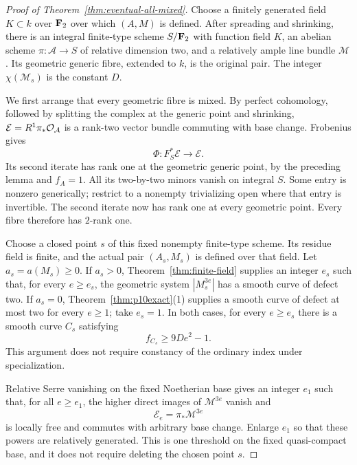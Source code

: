 \begin{proof}[Proof of Theorem~\ref{thm:eventual-all-mixed}]
Choose a finitely generated field $K\subset k$ over $\mathbf F_2$ over which $(A,M)$ is defined. After spreading and shrinking, there is an integral finite-type scheme $S/\mathbf F_2$ with function field $K$, an abelian scheme $\pi:\mathcal A\to S$ of relative dimension two, and a relatively ample line bundle $\mathcal M$. Its geometric generic fibre, extended to $k$, is the original pair. The integer $\chi(\mathcal M_s)$ is the constant $D$.

We first arrange that every geometric fibre is mixed. By perfect cohomology, followed by splitting the complex at the generic point and shrinking, $\mathcal E=R^1\pi_*\mathcal O_{\mathcal A}$ is a rank-two vector bundle commuting with base change. Frobenius gives
\[
 \Phi:F_S^*\mathcal E\longrightarrow\mathcal E.
\]
Its second iterate has rank one at the geometric generic point, by the preceding lemma and $f_A=1$. All its two-by-two minors vanish on integral $S$. Some entry is nonzero generically; restrict to a nonempty trivializing open where that entry is invertible. The second iterate now has rank one at every geometric point. Every fibre therefore has $2$-rank one.

Choose a closed point $s$ of this fixed nonempty finite-type scheme. Its residue field is finite, and the actual pair $(A_s,M_s)$ is defined over that field. Let $a_s=a(M_s)\ge0$. If $a_s>0$, Theorem~\ref{thm:finite-field} supplies an integer $e_s$ such that, for every $e\ge e_s$, the geometric system $|M_s^{3e}|$ has a smooth curve of defect two. If $a_s=0$, Theorem~\ref{thm:p10exact}(1) supplies a smooth curve of defect at most two for every $e\ge1$; take $e_s=1$. In both cases, for every $e\ge e_s$ there is a smooth curve $C_s$ satisfying
\begin{equation}\label{eq:special-rank-bound}
                    f_{C_s}\ge 9De^2-1.
\end{equation}
This argument does not require constancy of the ordinary index under specialization.

Relative Serre vanishing on the fixed Noetherian base gives an integer $e_1$ such that, for all $e\ge e_1$, the higher direct images of $\mathcal M^{3e}$ vanish and
\[
                  \mathcal E_e=\pi_*\mathcal M^{3e}
\]
is locally free and commutes with arbitrary base change. Enlarge $e_1$ so that these powers are relatively generated. This is one threshold on the fixed quasi-compact base, and it does not require deleting the chosen point $s$.


\end{proof}
